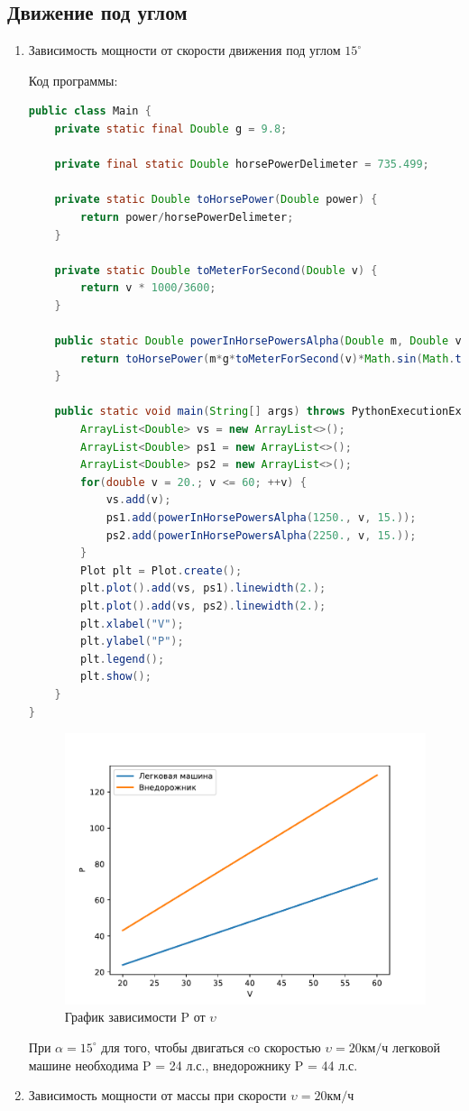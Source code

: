 \documentclass[a4paper, 14pt]{extarticle}
\begin{document}
		\subsection{Движение под углом}
			\begin{enumerate}
				\item Зависимость мощности от скорости движения под углом \( 15^\circ \)
				
				Код программы:
				\begin{lstlisting}[language=Java]
public class Main {
	private static final Double g = 9.8;
	
	private final static Double horsePowerDelimeter = 735.499;
	
	private static Double toHorsePower(Double power) {
		return power/horsePowerDelimeter;
	}
	
	private static Double toMeterForSecond(Double v) {
		return v * 1000/3600;
	}
	
	public static Double powerInHorsePowersAlpha(Double m, Double v, Double alpha) {
		return toHorsePower(m*g*toMeterForSecond(v)*Math.sin(Math.toRadians(alpha)));
	}
	
	public static void main(String[] args) throws PythonExecutionException, IOException {
		ArrayList<Double> vs = new ArrayList<>();
		ArrayList<Double> ps1 = new ArrayList<>();
		ArrayList<Double> ps2 = new ArrayList<>();
		for(double v = 20.; v <= 60; ++v) {
			vs.add(v);
			ps1.add(powerInHorsePowersAlpha(1250., v, 15.));
			ps2.add(powerInHorsePowersAlpha(2250., v, 15.));
		}
		Plot plt = Plot.create();
		plt.plot().add(vs, ps1).linewidth(2.);
		plt.plot().add(vs, ps2).linewidth(2.);
		plt.xlabel("V");
		plt.ylabel("P");
		plt.legend();
		plt.show();
	}
}
				\end{lstlisting}
				\begin{figure}[H]
					\centering
					\includegraphics[width = \linewidth]{fig1.pdf}
					\caption[.] {График зависимости P от \( \upsilon \)}
				\end{figure}
				При \( \alpha = 15^\circ \) для того, чтобы двигаться 
				cо скоростью \( \upsilon = 20 \text{км}/\text{ч} \) легковой машине необходима P = 24 л.с.,
				внедорожнику P = 44 л.с. 
				\pagebreak
				\item Зависимость мощности от массы при скорости \( \upsilon = 20 \text{км}/\text{ч} \)
				

\end{enumerate}
\end{document}
